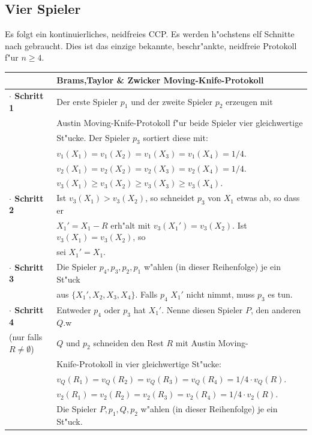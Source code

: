 \documentclass[11pt, a4paper, twoside]{article}
\newcommand{\wf}{\color{white}}
\newcommand{\tf}{\color{black}}
\numberwithin{equation}{section}
\begin{document}
\subsection{Vier Spieler}
Es folgt ein kontinuierliches, neidfreies CCP. Es werden h"ochstens elf Schnitte nach \cite{40} gebraucht. Dies ist das einzige bekannte, beschr"ankte, neidfreie Protokoll f"ur $n \geq 4$.\\ 
\newline
\begin{tabular}{|ll|}
\hline
&\textbf{Brams,Taylor \& Zwicker Moving-Knife-Protokoll}\\
\hline
\textbf{$\cdot$ Schritt 1}&Der erste Spieler $p_1$ und der zweite Spieler $p_2$ erzeugen mit\\&Austin Moving-Knife-Protokoll f"ur beide Spieler vier gleichwertige\\&St"ucke. Der Spieler $p_3$ sortiert diese mit:\\
& $v_1(X_1)=v_1(X_2)=v_1(X_3)=v_1(X_4)=1/4.$\\
& $v_2(X_1)=v_2(X_2)=v_2(X_3)=v_2(X_4)=1/4.$\\
& $v_3(X_1)\geq  v_3(X_2)\geq v_3(X_3)\geq v_3(X_4).$\\
\textbf{$\cdot$ Schritt 2}& Ist $v_3(X_1)>v_3(X_2)$, so schneidet $p_3$ von $X_1$ etwas ab, so dass er\\&$X_1'=X_1-R$ erh"alt mit $v_3(X_1')=v_3(X_2)$. Ist $v_3(X_1)=v_3(X_2)$, so\\&sei  $X_1'=X_1$.\\
\textbf{$\cdot$ Schritt 3}&Die Spieler $p_4,p_3,p_2,p_1$ w"ahlen (in dieser Reihenfolge) je ein St"uck\\&aus $\{X_1',X_2,X_3,X_4\}$. Falls $p_4$ $X_1'$ nicht nimmt, muss $p_3$ es tun.\\
\textbf{$\cdot$ Schritt 4}& Entweder $p_4$ oder $p_3$ hat $X_1'$. Nenne diesen Spieler $P$, den anderen $Q$.\wf w\tf\\(nur falls $R \neq \emptyset$)&$Q$  und  $p_2$ schneiden den Rest $R$ mit Austin Moving-\\&Knife-Protokoll in vier gleichwertige St"ucke:\\
& $v_Q(R_1)=v_Q(R_2)=v_Q(R_3)=v_Q(R_4)=1/4 \cdot v_Q(R).$\\& $v_2(R_1)=v_2(R_2)=v_2(R_3)=v_2(R_4)=1/4 \cdot v_2(R).$\\&Die Spieler $P,p_1,Q,p_2$ w"ahlen (in dieser Reihenfolge) je ein St"uck.\\
\hline
\end{tabular}
\newline
\end{document}
